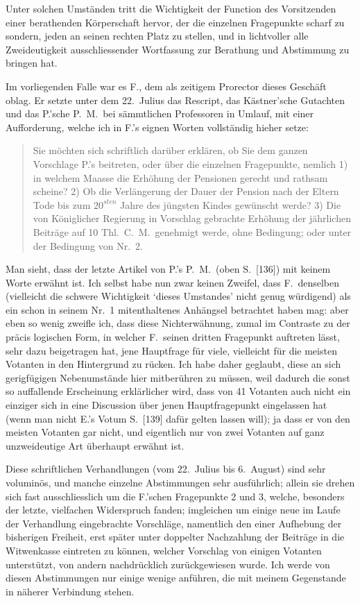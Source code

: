 \documentclass[12pt,a4paper]{article}
\begin{document}
Unter solchen Umst\"anden tritt die Wichtigkeit der Function des Vorsitzenden einer berathenden K\"orperschaft hervor, der die einzelnen Fragepunkte scharf zu sondern, jeden an seinen rechten Platz zu stellen, und in lichtvoller alle Zweideutigkeit ausschliessender Wortfassung zur Berathung und Abstimmung zu bringen hat.

Im vorliegenden Falle war es F., dem als zeitigem Prorector dieses Gesch\"aft oblag. Er setzte unter dem 22.\ Julius das Rescript, das K\"astner'sche Gutachten und das P.'sche P.\ M.\ bei s\"ammtlichen Professoren in Umlauf, mit einer Aufforderung, welche ich in F.'s eignen Worten vollst\"andig hieher setze:

\begin{quote}
Sie m\"ochten sich schriftlich dar\"uber erkl\"aren, ob Sie dem ganzen Vorschlage P.'s beitreten, oder \"uber die einzelnen Fragepunkte, nemlich 1) in welchem Maasse die Erh\"ohung der Pensionen gerecht und rathsam scheine? 2) Ob die Verl\"angerung der Dauer der Pension nach der Eltern Tode bis zum $20^{sten}$ Jahre des j\"ungsten Kindes gew\"unscht werde? 3) Die von K\"oniglicher Regierung in Vorschlag gebrachte Erh\"ohung der j\"ahrlichen Beitr\"age auf 10 Thl.\ C.\ M.\ genehmigt werde, ohne Bedingung; oder unter der Bedingung von Nr.\ 2.
\end{quote}

Man sieht, dass der letzte Artikel von P.'s P.\ M.\ (oben S.\ [136]) mit keinem Worte erw\"ahnt ist. Ich selbst habe nun zwar keinen Zweifel, dass F.\ denselben (vielleicht die schwere Wichtigkeit `dieses Umstandes' nicht genug w\"urdigend) als ein schon in seinem Nr.\ 1 mitenthaltenes Anh\"angsel betrachtet haben mag: aber eben so wenig zweifle ich, dass diese Nichterw\"ahnung, zumal im Contraste zu der pr\"acis logischen Form, in welcher F.\ seinen dritten Fragepunkt auftreten l\"asst, sehr dazu beigetragen hat, jene Hauptfrage f\"ur viele, vielleicht f\"ur die meisten Votanten in den Hintergrund zu r\"ucken. Ich habe daher geglaubt, diese an sich gerigf\"ugigen Nebenumst\"ande hier mitber\"uhren zu m\"ussen, weil dadurch die sonst so auffallende Erscheinung erkl\"arlicher wird, dass von 41 Votanten auch nicht ein einziger sich in eine Discussion \"uber jenen Hauptfragepunkt eingelassen hat (wenn man nicht E.'s Votum S.\ [139] daf\"ur gelten lassen will); ja dass er von den meisten Votanten gar nicht, und eigentlich nur von zwei Votanten auf ganz unzweideutige Art \"uberhaupt erw\"ahnt ist.

Diese schriftlichen Verhandlungen (vom 22.\ Julius bis 6.\ August) sind sehr volumin\"os, und manche einzelne Abstimmungen sehr ausf\"uhrlich; allein sie drehen sich fast ausschliesslich um die F.'schen Fragepunkte 2 und 3, welche, besonders der letzte, vielfachen Widerspruch fanden; imgleichen um einige neue im Laufe der Verhandlung eingebrachte Vorschl\"age, namentlich den einer Aufhebung der bisherigen Freiheit, erst sp\"ater unter doppelter Nachzahlung der Beitr\"age in die Witwenkasse eintreten zu k\"onnen, welcher Vorschlag von einigen Votanten unterst\"utzt, von andern nachdr\"ucklich zur\"uckgewiesen wurde. Ich werde von diesen Abstimmungen nur einige wenige anf\"uhren, die mit meinem Gegenstande in n\"aherer Verbindung stehen.
\end{document}
